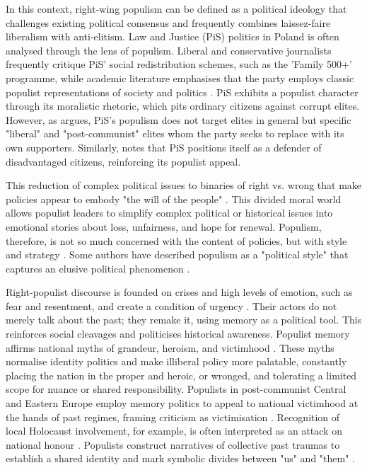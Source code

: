 In this context, right-wing populism can be defined as a political ideology that challenges existing political consensus and frequently combines laissez-faire liberalism with anti-elitism. Law and Justice (PiS) politics in Poland is often analysed through the lens of populism. Liberal and conservative journalists frequently critique PiS' social redistribution schemes, such as the 'Family 500+' programme, while academic literature emphasises that the party employs classic populist representations of society and politics \citep{cadier_populism_2020}. PiS exhibits a populist character through its moralistic rhetoric, which pits ordinary citizens against corrupt elites. However, as \citet{bill_counter-elite_2022} argues, PiS's populism does not target elites in general but specific "liberal" and "post-communist" elites whom the party seeks to replace with its own supporters. Similarly, \citet{ost_workers_2018} notes that PiS positions itself as a defender of disadvantaged citizens, reinforcing its populist appeal.

This reduction of complex political issues to binaries of right vs. wrong  that make policies appear to embody "the will of the people" \citep{couperus_memory_2023}. This divided moral world allows populist leaders to simplify complex political or historical issues into emotional stories about loss, unfairness, and hope for renewal. Populism, therefore, is not so much concerned with the content of policies, but with style and strategy \citep{forchtner_trajectory_2019}. Some authors have described populism as a "political style" that captures an elusive political phenomenon \citep{moffitt_global_2016}.

Right-populist discourse is founded on crises and high levels of emotion, such as fear and resentment, and create a condition of urgency \citep{forchtner_trajectory_2019}. Their actors do not merely talk about the past; they remake it, using memory as a political tool. This reinforces social cleavages and politicises historical awareness. Populist memory affirms national myths of grandeur, heroism, and victimhood \citep{subotic_political_2018}. These myths normalise identity politics and make illiberal policy more palatable, constantly  placing the nation in the proper and heroic, or wronged, and tolerating a limited scope for nuance or shared responsibility. Populists in post-communist Central and Eastern Europe employ memory politics to appeal to national victimhood at the hands of past regimes, framing criticism as victimisation \citep{woycicka_mnemonic_2024}. Recognition of local Holocaust involvement, for example, is often interpreted as an attack on national honour \citep{grabowski_memory_2018}. Populists construct narratives of collective past traumas to establish a shared identity and mark symbolic divides between "us" and "them" \citep{wydra_generations_2018}.

